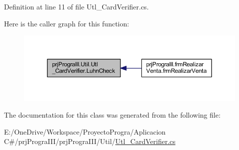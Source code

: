 Definition at line 11 of file Utl\+\_\+\+Card\+Verifier.\+cs.

Here is the caller graph for this function\+:
\nopagebreak
\begin{figure}[H]
\begin{center}
\leavevmode
\includegraphics[width=350pt]{classprj_progra_i_i_i_1_1_util_1_1_utl___card_verifier_ad387c83560ed0b90ab57ce4e529d3e12_icgraph}
\end{center}
\end{figure}


The documentation for this class was generated from the following file\+:\begin{DoxyCompactItemize}
\item 
E\+:/\+One\+Drive/\+Workspace/\+Proyecto\+Progra/\+Aplicacion C\#/prj\+Progra\+I\+I\+I/prj\+Progra\+I\+I\+I/\+Util/\hyperlink{_utl___card_verifier_8cs}{Utl\+\_\+\+Card\+Verifier.\+cs}\end{DoxyCompactItemize}
